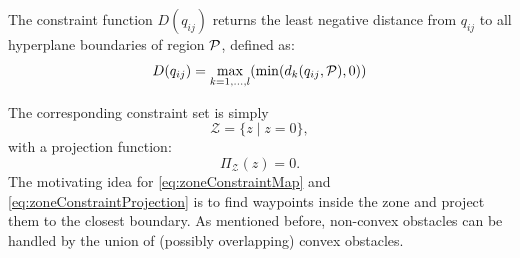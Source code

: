 \documentclass[journal]{IEEEtran}  %
\def\sZ{\mathcal{Z}}
\begin{document}
The constraint function $D(q_{ij})$ returns the least negative distance from $q_{ij}$ to all hyperplane boundaries of region $\mathcal{P}$, defined as:
\begin{equation}\label{eq:zoneConstraintMap}
	D(q_{ij}) = \max_{k=1,\dots,l} (\min(d_{k}(q_{ij},\mathcal{P}),0))
\end{equation}
  

The corresponding constraint set is simply
\begin{equation}
    \sZ= \{z \mid z = 0 \},
\end{equation}
with a projection function:
\begin{equation}\label{eq:zoneConstraintProjection}
    \Pi_\sZ(z) = 0.
\end{equation}
The motivating idea for \eqref{eq:zoneConstraintMap} and \eqref{eq:zoneConstraintProjection} is to find waypoints inside the zone and project them to the closest boundary. As mentioned before, non-convex obstacles can be handled by the union of (possibly overlapping) convex obstacles.
\end{document}
